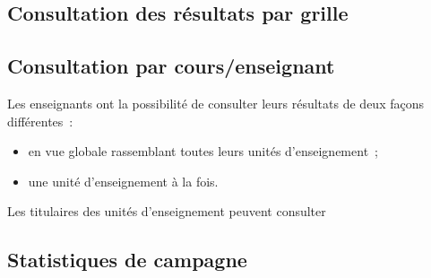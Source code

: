 \documentclass[a4paper,11pt]{report}
\begin{document}






\subsection{Consultation des résultats par grille}






\subsection{Consultation par cours/enseignant}
Les enseignants ont la possibilité de consulter leurs résultats de deux façons différentes~:
\begin{itemize}
	\item en vue globale rassemblant toutes leurs unités d'enseignement~;
	\item une unité d'enseignement à la fois.
\end{itemize}

Les titulaires des unités d'enseignement peuvent consulter






\subsection{Statistiques de campagne}
\end{document}

